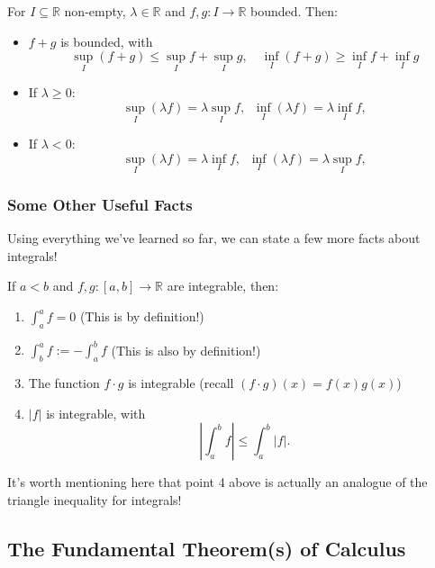 \documentclass[
  10pt,
  a4paper]{article}
\providecommand{\tightlist}{%
  \setlength{\itemsep}{0pt}\setlength{\parskip}{0pt}}
\theoremstyle{plain}
\theoremstyle{definition}
\theoremstyle{plain}
\theoremstyle{plain}
\theoremstyle{plain}
\theoremstyle{plain}
\theoremstyle{definition}
\theoremstyle{definition}
\theoremstyle{remark}
\theoremstyle{remark}
\let\BeginKnitrBlock\begin \let\EndKnitrBlock\end
\begin{document}
\BeginKnitrBlock{proposition}
{\label{prp:prop1} }For \(I \subseteq \mathbb{R}\) non-empty, \(\lambda \in \mathbb{R}\) and \(f,g:I \to \mathbb{R}\) bounded. Then:

\begin{itemize}
\tightlist
\item
  \(f+g\) is bounded, with \[\sup_{I}(f + g) \leq \sup_{I}f + \sup_{I}g, \quad \inf_{I}(f + g) \geq \inf_{I}f + \inf_{I}g\]
\item
  If \(\lambda \geq 0\): \[\sup_{I}(\lambda f) = \lambda\sup_{I}f, \;\; \inf_{I}(\lambda f) = \lambda\inf_{I}f,\]
\item
  If \(\lambda < 0\): \[\sup_{I}(\lambda f) = \lambda\inf_{I}f, \;\; \inf_{I}(\lambda f) = \lambda\sup_{I}f,\]
\end{itemize}
\EndKnitrBlock{proposition}

\hypertarget{some-other-useful-facts}{%
\subsubsection{Some Other Useful Facts}\label{some-other-useful-facts}}

Using everything we've learned so far, we can state a few more facts about integrals!

\BeginKnitrBlock{proposition}
{\label{prp:prop2} }If \(a<b\) and \(f,g:[a,b] \to \mathbb{R}\) are integrable, then:

\begin{enumerate}
\def\labelenumi{\arabic{enumi})}
\tightlist
\item
  \(\int_a^a f = 0\) (This is by definition!)
\item
  \(\int_b^a f := -\int_a^b f\) (This is also by definition!)
\item
  The function \(f \cdot g\) is integrable (recall \((f\cdot g)(x) = f(x)g(x)\))
\item
  \(\lvert f \rvert\) is integrable, with \[\left\lvert\int_a^b f \right\rvert \leq \int_a^b \lvert f \rvert.\]
\end{enumerate}
\EndKnitrBlock{proposition}

It's worth mentioning here that point 4 above is actually an analogue of the triangle inequality for integrals!

\hypertarget{the-fundamental-theorems-of-calculus}{%
\subsection{The Fundamental Theorem(s) of Calculus}\label{the-fundamental-theorems-of-calculus}}
\end{document}
